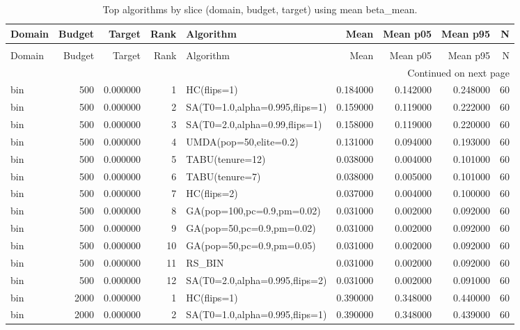 \begin{longtable}{lrrrlrrrr}
\caption{Top algorithms by slice (domain, budget, target) using mean beta_mean.} \label{tab:top_algos_by_slice} \\
\toprule
Domain & Budget & Target & Rank & Algorithm & Mean & Mean p05 & Mean p95 & N \\
\midrule
\endfirsthead
\caption[]{Top algorithms by slice (domain, budget, target) using mean beta_mean.} \\
\toprule
Domain & Budget & Target & Rank & Algorithm & Mean & Mean p05 & Mean p95 & N \\
\midrule
\endhead
\midrule
\multicolumn{9}{r}{Continued on next page} \\
\midrule
\endfoot
\bottomrule
\endlastfoot
bin & 500 & 0.000000 & 1 & HC(flips=1) & 0.184000 & 0.142000 & 0.248000 & 60 \\
bin & 500 & 0.000000 & 2 & SA(T0=1.0,alpha=0.995,flips=1) & 0.159000 & 0.119000 & 0.222000 & 60 \\
bin & 500 & 0.000000 & 3 & SA(T0=2.0,alpha=0.99,flips=1) & 0.158000 & 0.119000 & 0.220000 & 60 \\
bin & 500 & 0.000000 & 4 & UMDA(pop=50,elite=0.2) & 0.131000 & 0.094000 & 0.193000 & 60 \\
bin & 500 & 0.000000 & 5 & TABU(tenure=12) & 0.038000 & 0.004000 & 0.101000 & 60 \\
bin & 500 & 0.000000 & 6 & TABU(tenure=7) & 0.038000 & 0.005000 & 0.101000 & 60 \\
bin & 500 & 0.000000 & 7 & HC(flips=2) & 0.037000 & 0.004000 & 0.100000 & 60 \\
bin & 500 & 0.000000 & 8 & GA(pop=100,pc=0.9,pm=0.02) & 0.031000 & 0.002000 & 0.092000 & 60 \\
bin & 500 & 0.000000 & 9 & GA(pop=50,pc=0.9,pm=0.02) & 0.031000 & 0.002000 & 0.092000 & 60 \\
bin & 500 & 0.000000 & 10 & GA(pop=50,pc=0.9,pm=0.05) & 0.031000 & 0.002000 & 0.092000 & 60 \\
bin & 500 & 0.000000 & 11 & RS\_BIN & 0.031000 & 0.002000 & 0.092000 & 60 \\
bin & 500 & 0.000000 & 12 & SA(T0=2.0,alpha=0.995,flips=2) & 0.031000 & 0.002000 & 0.091000 & 60 \\
bin & 2000 & 0.000000 & 1 & HC(flips=1) & 0.390000 & 0.348000 & 0.440000 & 60 \\
bin & 2000 & 0.000000 & 2 & SA(T0=1.0,alpha=0.995,flips=1) & 0.390000 & 0.348000 & 0.439000 & 60 \\

\end{longtable}
